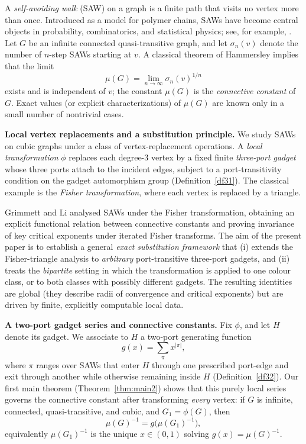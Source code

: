 \documentclass[12pt]{amsart}
\theoremstyle{plain}
\numberwithin{equation}{section}
\numberwithin{theorem}{section}
\numberwithin{figure}{section}
\begin{document}
A \emph{self-avoiding walk} (SAW) on a graph is a finite path that visits no vertex more
than once.  Introduced as a model for polymer chains, SAWs have become central objects
in probability, combinatorics, and statistical physics; see, for example, \cite{f,ms}.
Let $G$ be an infinite connected quasi-transitive graph, and let $\sigma_n(v)$ denote the
number of $n$-step SAWs starting at $v$.  A classical theorem of Hammersley implies that
the limit
\[
\mu(G)=\lim_{n\to\infty}\sigma_n(v)^{1/n}
\]
exists and is independent of $v$; the constant $\mu(G)$ is the \emph{connective constant}
of $G$.  Exact values (or explicit characterizations) of $\mu(G)$ are known only in a small
number of nontrivial cases.

\medskip
\noindent\textbf{Local vertex replacements and a substitution principle.}
We study SAWs on cubic graphs under a class of vertex-replacement operations.
A \emph{local transformation} $\phi$ replaces each degree-$3$ vertex by a fixed finite
\emph{three-port gadget} whose three ports attach to the incident edges, subject to a
port-transitivity condition on the gadget automorphism group (Definition~\ref{df31}).
The classical example is the \emph{Fisher transformation}, where each vertex is replaced
by a triangle.

Grimmett and Li \cite{GrimmettLi2013Fisher} analysed SAWs under the Fisher transformation,
obtaining an explicit functional relation between connective constants and proving
invariance of key critical exponents under iterated Fisher transforms.
The aim of the present paper is to establish a general \emph{exact substitution framework} that
(i) extends the Fisher-triangle analysis to \emph{arbitrary} port-transitive three-port gadgets,
and (ii) treats the \emph{bipartite} setting in which the transformation is applied to one
colour class, or to both classes with possibly different gadgets.  The resulting identities
are global (they describe radii of convergence and critical exponents) but are driven by
finite, explicitly computable local data.

\medskip
\noindent\textbf{A two-port gadget series and connective constants.}
Fix $\phi$, and let $H$ denote its gadget.  We associate to $H$ a two-port generating function
\begin{equation}\label{eq:intro-g}
g(x)=\sum_{\pi} x^{|\pi|},
\end{equation}
where $\pi$ ranges over SAWs that enter $H$ through one prescribed port-edge and exit
through another while otherwise remaining inside $H$ (Definition~\ref{df32}).
Our first main theorem (Theorem~\ref{thm:main2}) shows that this purely local series governs
the connective constant after transforming \emph{every} vertex:
if $G$ is infinite, connected, quasi-transitive, and cubic, and $G_1=\phi(G)$, then
\begin{equation}\label{eq:intro-mu}
\mu(G)^{-1}=g\bigl(\mu(G_1)^{-1}\bigr),
\end{equation}
equivalently $\mu(G_1)^{-1}$ is the unique $x\in(0,1)$ solving $g(x)=\mu(G)^{-1}$.
\end{document}
